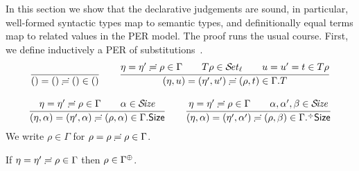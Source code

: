 \documentclass[acmsmall%
]{acmart}\settopmatter{printfolios=true}
\begin{document}
In this section we show that the declarative judgements are sound, in
particular, well-formed syntactic types map to semantic types, and
definitionally equal terms map to related values in the PER model.
The proof runs the usual course.  First, we define inductively a
PER of substitutions
\,.
\begin{gather*}
  \ru{
    }{\sempty = \sempty \eeq \sempty \in \cempty}
\qquad
  \ru{\eta = \eta' \eeq \rho \in \Gamma \qquad
      T\rho \in \SET[\ell] \qquad
      u = u' = t \in T \rho
    }{\sext \eta u = \sext{\eta'}{u'} \eeq \sext{\rho}{t} \in \cext \Gamma T}
\\[2ex]
  \ru{\eta = \eta' \eeq \rho \in \Gamma \qquad \alpha \in \SIZE
    }{\sext \eta \alpha = \sext{\eta'}{\alpha} \eeq \sext{\rho}{\alpha} \in \cext \Gamma \Size}
\qquad
  \ru{\eta = \eta' \eeq \rho \in \Gamma \qquad \alpha,\alpha',\beta \in \SIZE
    }{\sext \eta \alpha = \sext{\eta'}{\alpha'} \eeq \sext{\rho}{\beta} \in \erext \Gamma \Size}
\end{gather*}
We write $\rho \in \Gamma$ for $\rho = \rho \risingdotseq \rho \in \Gamma$.
\begin{lemma}[Resurrection]
  \label{lem:resenv}
  If\/ $\eta = \eta' \risingdotseq \rho \in \Gamma$ then $\rho \in \resurrect\Gamma$.
\end{lemma}
\end{document}
